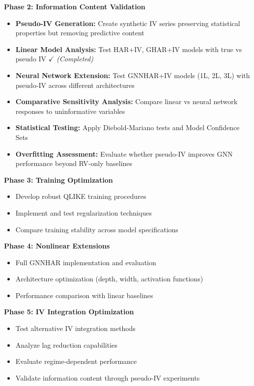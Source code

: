 \documentclass[12pt,a4paper]{article}
\begin{document}
\textbf{Phase 2: Information Content Validation}
\begin{itemize}
\item \textbf{Pseudo-IV Generation:} Create synthetic IV series preserving statistical properties but removing predictive content
\item \textbf{Linear Model Analysis:} Test HAR+IV, GHAR+IV models with true vs pseudo IV $\checkmark$ \textit{(Completed)}
\item \textbf{Neural Network Extension:} Test GNNHAR+IV models (1L, 2L, 3L) with pseudo-IV across different architectures
\item \textbf{Comparative Sensitivity Analysis:} Compare linear vs neural network responses to uninformative variables
\item \textbf{Statistical Testing:} Apply Diebold-Mariano tests and Model Confidence Sets
\item \textbf{Overfitting Assessment:} Evaluate whether pseudo-IV improves GNN performance beyond RV-only baselines
\end{itemize}

\textbf{Phase 3: Training Optimization}
\begin{itemize}
\item Develop robust QLIKE training procedures
\item Implement and test regularization techniques
\item Compare training stability across model specifications
\end{itemize}

\textbf{Phase 4: Nonlinear Extensions}
\begin{itemize}
\item Full GNNHAR implementation and evaluation
\item Architecture optimization (depth, width, activation functions)
\item Performance comparison with linear baselines
\end{itemize}

\textbf{Phase 5: IV Integration Optimization}
\begin{itemize}
\item Test alternative IV integration methods
\item Analyze lag reduction capabilities
\item Evaluate regime-dependent performance
\item Validate information content through pseudo-IV experiments
\end{itemize}
\end{document}
